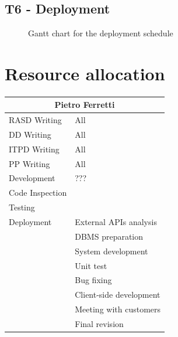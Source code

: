 \documentclass[english]{article}
\begin{document}
\subsection{T6 - Deployment}

\begin{figure}[H]
	\centering
	\caption{Gantt chart for the deployment schedule}
\end{figure}

\section{Resource allocation}

\paragraph{}

\begin{center}
	\begin{tabular}{|p{3cm}|p{4cm}|}
		\hline
		\multicolumn{2}{|c|}{\textbf{Pietro Ferretti}}\\
		\hline
		RASD Writing & All\\
		\hline
		DD Writing & All\\
		\hline
		ITPD Writing & All\\
		\hline
		PP Writing & All\\
		\hline
		Development & ???\\
		Code Inspection & \\
		Testing & \\
		\hline
		Deployment & External APIs analysis\\
		& DBMS preparation\\
		& System development\\
		& Unit test\\
		& Bug fixing\\
		& Client-side development\\
		& Meeting with customers\\
		& Final revision\\
		\hline
		
	\end{tabular}
\end{center}
\end{document}
